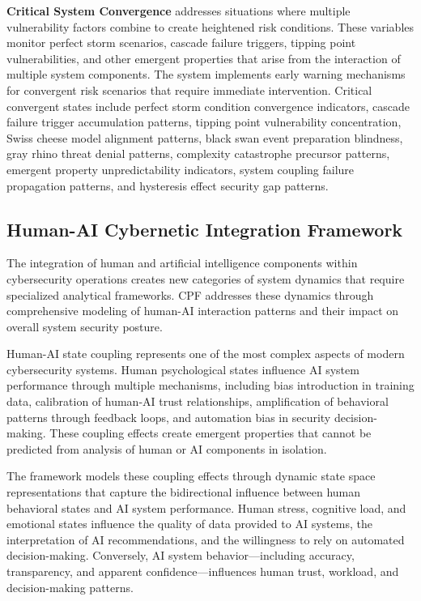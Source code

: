 \documentclass[journal]{IEEEtran}
\begin{document}
\textbf{Critical System Convergence} addresses situations where multiple vulnerability factors combine to create heightened risk conditions. These variables monitor perfect storm scenarios, cascade failure triggers, tipping point vulnerabilities, and other emergent properties that arise from the interaction of multiple system components. The system implements early warning mechanisms for convergent risk scenarios that require immediate intervention. Critical convergent states include perfect storm condition convergence indicators, cascade failure trigger accumulation patterns, tipping point vulnerability concentration, Swiss cheese model alignment patterns, black swan event preparation blindness, gray rhino threat denial patterns, complexity catastrophe precursor patterns, emergent property unpredictability indicators, system coupling failure propagation patterns, and hysteresis effect security gap patterns.

\subsection{Human-AI Cybernetic Integration Framework}

The integration of human and artificial intelligence components within cybersecurity operations creates new categories of system dynamics that require specialized analytical frameworks. CPF addresses these dynamics through comprehensive modeling of human-AI interaction patterns and their impact on overall system security posture.

Human-AI state coupling represents one of the most complex aspects of modern cybersecurity systems. Human psychological states influence AI system performance through multiple mechanisms, including bias introduction in training data, calibration of human-AI trust relationships, amplification of behavioral patterns through feedback loops, and automation bias in security decision-making. These coupling effects create emergent properties that cannot be predicted from analysis of human or AI components in isolation.

The framework models these coupling effects through dynamic state space representations that capture the bidirectional influence between human behavioral states and AI system performance. Human stress, cognitive load, and emotional states influence the quality of data provided to AI systems, the interpretation of AI recommendations, and the willingness to rely on automated decision-making. Conversely, AI system behavior—including accuracy, transparency, and apparent confidence—influences human trust, workload, and decision-making patterns.
\end{document}
